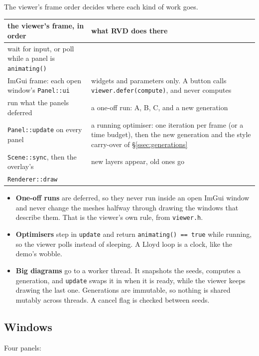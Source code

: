 \documentclass[11pt,a4paper]{article}
\newcommand{\code}[1]{\texttt{#1}}          %
\newcommand{\secref}[1]{\S\ref{#1}}
\begin{document}
The viewer's frame order decides where each kind of work goes.

{\small
\begin{xltabular}{\linewidth}{@{}P{5.4cm} L@{}}
\toprule
the viewer's frame, in order & what RVD does there \\
\midrule
\endhead
wait for input, or poll while a panel is \code{animating()} & \\
ImGui frame: each open window's \code{Panel::ui}
  & widgets and parameters only. A button calls \code{viewer.defer(compute)}, and never
    computes \\
run what the panels deferred & a one-off run: A, B, C, and a new generation \\
\code{Panel::update} on every panel
  & a running optimiser: one iteration per frame (or a time budget), then the new generation
    and the style carry-over of \secref{ssec:generations} \\
\code{Scene::sync}, then the overlay's & new layers appear, old ones go \\
\code{Renderer::draw} & \\
\bottomrule
\end{xltabular}}

\begin{itemize}
\item \textbf{One-off runs} are deferred, so they never run inside an open ImGui window and never
  change the meshes halfway through drawing the windows that describe them. That is the viewer's
  own rule, from \code{viewer.h}.
\item \textbf{Optimisers} step in \code{update} and return \code{animating()~==~true} while
  running, so the viewer polls instead of sleeping. A Lloyd loop is a clock, like the demo's
  wobble.
\item \textbf{Big diagrams} go to a worker thread. It snapshots the seeds, computes a generation,
  and \code{update} swaps it in when it is ready, while the viewer keeps drawing the last one.
  Generations are immutable, so nothing is shared mutably across threads. A cancel flag is
  checked between seeds.
\end{itemize}

\subsection{Windows}\label{ssec:windows}

Four panels:
\end{document}
